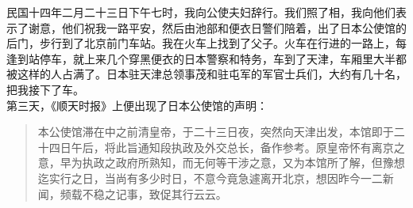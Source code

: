 民国十四年二月二十三日下午七时，我向公使夫妇辞行。我们照了相，我向他们表示了谢意，他们祝我一路平安，然后由池部和便衣日警们陪着，出了日本公使馆的后门，步行到了北京前门车站。我在火车上找到了父子。火车在行进的一路上，每逢到站停车，就上来几个穿黑便衣的日本警察和特务，车到了天津，车厢里大半都被这样的人占满了。日本驻天津总领事茂和驻屯军的军官士兵们，大约有几十名，把我接下了车。\\

第三天，《顺天时报》上便出现了日本公使馆的声明：\\

\begin{quote}
	本公使馆滞在中之前清皇帝，于二十三日夜，突然向天津出发，本馆即于二十四日午后，将此旨通知段执政及外交总长，备作参考。原皇帝怀有离京之意，早为执政之政府所熟知，而无何等干涉之意，又为本馆所了解，但豫想迄实行之日，当尚有多少时日，不意今竟急遽离开北京，想因昨今一二新闻，频载不稳之记事，致促其行云云。
\end{quote}
